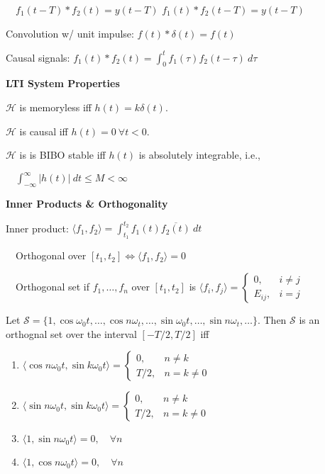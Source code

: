 \documentclass[twocolumn]{article}
\begin{document}
$\quad f_1(t-T) * f_2(t) = y(t-T)$ \hfill $f_1(t) * f_2(t-T) = y(t-T)$

Convolution w/ unit impulse: $f(t) * \delta(t) = f(t)$

Causal signals: $f_1(t) * f_2(t) = \int_0^t f_1(\tau) f_2(t-\tau)\ d\tau$


\cleardoublepage


\textbf{LTI System Properties}

$\mathcal{H}$ is memoryless iff $h(t) = k \delta(t)$.

$\mathcal{H}$ is causal iff $h(t) = 0\ \forall t < 0$.

$\mathcal{H}$ is is BIBO stable iff $h(t)$ is absolutely integrable, i.e.,

$\quad \int_{-\infty}^\infty |h(t)|\ dt \leq M < \infty$

\dotfill

\textbf{Inner Products \& Orthogonality}

Inner product: $\langle f_1, f_2 \rangle = \int_{t_1}^{t_2} f_1(t) \overline{f_2(t)}\ dt$

$\quad$Orthogonal over $[t_1, t_2] \iff \langle f_1, f_2 \rangle = 0$

$\quad$Orthogonal set if $f_1, \dots, f_n$ over $[t_1, t_2]$ is $\langle f_i, f_j \rangle = \begin{cases} 0, & i \neq j \\ E_{ij}, & i = j \end{cases}$

Let $\mathcal{S} = \{ 1, \cos \omega_0 t, \dots, \cos n \omega_t, \dots, \sin \omega_0 t, \dots, \sin n \omega_t, \dots \}$. Then $\mathcal{S}$ is an orthognal set over the interval $[-T/2, T/2]$ iff

\vspace{-.5em}\begin{enumerate}
    \item $\langle \cos n \omega_0 t, \sin k \omega_0 t \rangle = \begin{cases} 0, & n \neq k \\ T/2, & n = k \neq 0 \end{cases}$
    \item $\langle \sin n \omega_0 t, \sin k \omega_0 t \rangle = \begin{cases} 0, & n \neq k \\ T/2, & n = k \neq 0 \end{cases}$
    \item $\langle 1, \sin n \omega_0 t \rangle = 0, \quad \forall n$
    \item $\langle 1, \cos n \omega_0 t \rangle = 0, \quad \forall n$
\end{enumerate} \vspace{-.5em}
\end{document}
